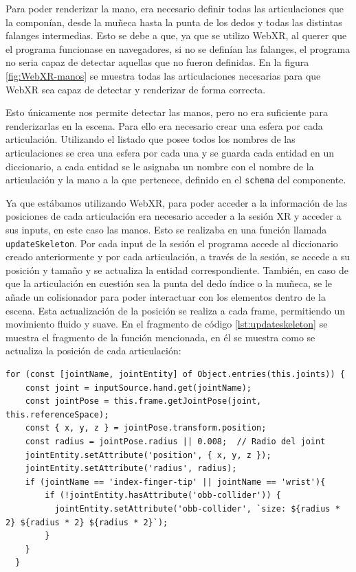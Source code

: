 \documentclass[a4paper, 12pt]{book}
\begin{document}
Para poder renderizar la mano, era necesario definir todas las articulaciones que la componían, desde la muñeca hasta la punta de los dedos y todas las distintas falanges intermedias. Esto se debe a que, ya que se utilizo WebXR, al querer que el programa funcionase en navegadores, si no se definían las falanges, el programa no seria capaz de detectar aquellas que no fueron definidas.
En la figura \ref{fig:WebXR-manos} se muestra todas las articulaciones necesarias para que WebXR sea capaz de detectar y renderizar de forma correcta. 

Esto únicamente nos permite detectar las manos, pero no era suficiente para renderizarlas en la escena. Para ello era necesario crear una esfera por cada articulación. Utilizando el listado que posee todos los nombres de las articulaciones se crea una esfera por cada una y se guarda cada entidad en un diccionario, a cada entidad se le asignaba un nombre con el nombre de la articulación y la mano a la que pertenece, definido en el \texttt{schema} del componente.

Ya que estábamos utilizando WebXR, para poder acceder a la información de las posiciones de cada articulación era necesario acceder a la sesión XR y acceder a sus inputs, en este caso las manos. Esto se realizaba en una función llamada \texttt{updateSkeleton}. Por cada input de la sesión el programa accede al diccionario creado anteriormente y por cada articulación, a través de la sesión, se accede a su posición y tamaño y se actualiza la entidad correspondiente. También, en caso de que la articulación en cuestión sea la punta del dedo índice o la muñeca, se le añade un colisionador para 
poder interactuar con los elementos dentro de la escena. Esta actualización de la posición se realiza a cada frame, permitiendo un movimiento fluido y suave. En el fragmento de código \ref{lst:updateskeleton} se muestra el fragmento de la función mencionada, en él se muestra como se actualiza la posición de cada articulación: 

\begin{lstlisting}[caption=Actualización de las manos en la escena, captionpos=b, label=lst:updateskeleton]
  for (const [jointName, jointEntity] of Object.entries(this.joints)) {
    const joint = inputSource.hand.get(jointName);
    const jointPose = this.frame.getJointPose(joint, this.referenceSpace);
    const { x, y, z } = jointPose.transform.position;
    const radius = jointPose.radius || 0.008;  // Radio del joint
    jointEntity.setAttribute('position', { x, y, z });
    jointEntity.setAttribute('radius', radius);
    if (jointName == 'index-finger-tip' || jointName == 'wrist'){
        if (!jointEntity.hasAttribute('obb-collider')) {
          jointEntity.setAttribute('obb-collider', `size: ${radius * 2} ${radius * 2} ${radius * 2}`);
        }
    }
  }
\end{lstlisting}
\end{document}
